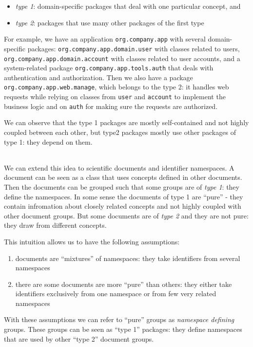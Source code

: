 \begin{itemize}
  \item \emph{type 1}: domain-specific packages that deal with one particular concept, and
  \item \emph{type 2}: packages that use many other packages of the first type
\end{itemize}


For example, we have an application \verb|org.company.app|
with several domain-specific packages: \verb|org.company.app.domain.user|
with classes related to users, \verb|org.company.app.domain.account|
with classes related to user accounts, and a system-related package
\verb|org.company.app.tools.auth| that deals with authentication and
authorization. Then we also have a package \verb|org.company.app.web.manage|,
which belongs to the type 2: it handles web requests
while relying on classes from \verb|user| and \verb|account| to
implement the business logic and on \verb|auth| for making sure the
requests are authorized.

We can observe that the type 1 packages are mostly self-contained
and not highly coupled between each other,
but type2 packages mostly use other packages of type 1: they
depend on them.

\ \\

We can extend this idea to scientific documents and identifier
namespaces. A document can be seen as a class that uses concepts defined
in other documents. Then the documents can be grouped such that
some groups are of \emph{type 1}: they define the namespaces. In some
sense the documents of type 1 are ``pure'' - they contain infromation
about closely related concepts and not highly coupled
with other document groups. But some documents are of \emph{type 2} and they
are not pure: they draw from different concepts.


This intuition allows us to have the following assumptions:

\begin{enumerate}
 \item documents are ``mixtures'' of namespaces: they take identifiers from several namespaces
 \item there are some documents are more ``pure'' than others: they either take identifiers exclusively from one namespace or from few very related namespaces
\end{enumerate}


With these assumptions we can refer to ``pure'' groups as
\emph{namespace defining} groups. These groups can be seen as
``type 1'' packages: they define namespaces that are used by other
``type 2'' document groups.


